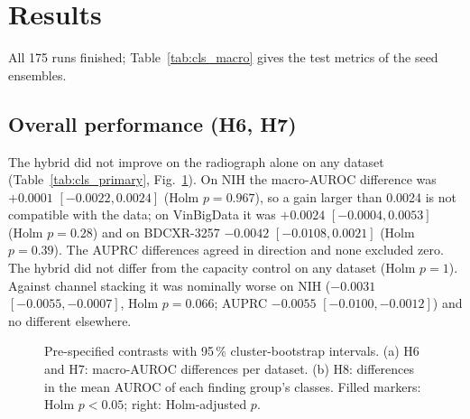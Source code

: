 \section{Results}
\label{sec:cls_results}
All 175 runs finished; Table~\ref{tab:cls_macro} gives the test metrics of the seed ensembles.

\begin{table}[htbp]
\centering\small
\caption{Test macro-AUROC and macro-AUPRC of the seed ensembles (five seeds; BDCXR-3257: out-of-fold over five folds). Descriptive; the
tests are in Tables~\ref{tab:cls_primary} and~\ref{tab:cls_groups}. orig: radiograph; soft: soft-tissue image; early: three images as
channels; hybrid: three streams; ctrl: radiograph in three streams.}
\label{tab:cls_macro}
\end{table}

\subsection{Overall performance (H6, H7)}
The hybrid did not improve on the radiograph alone on any dataset (Table~\ref{tab:cls_primary}, Fig.~\ref{fig:cls_forest}). On NIH the
macro-AUROC difference was $+0.0001$ $[-0.0022,0.0024]$ (Holm $p=0.967$), so a gain larger than 0.0024 is not compatible with the data; on
VinBigData it was $+0.0024$ $[-0.0004,0.0053]$ (Holm $p=0.28$) and on BDCXR-3257 $-0.0042$ $[-0.0108,0.0021]$ (Holm $p=0.39$). The
AUPRC differences agreed in direction and none excluded zero. The hybrid did not differ from the capacity control on any dataset (Holm
$p=1$). Against channel stacking it was nominally worse on NIH ($-0.0031$ $[-0.0055,-0.0007]$, Holm $p=0.066$; AUPRC $-0.0055$
$[-0.0100,-0.0012]$) and no different elsewhere.

\begin{table}[htbp]
\centering\footnotesize
\caption{H6 (primary) and H7: differences of the seed ensembles with 95\,\% cluster-bootstrap intervals (\num{10000} resamples). Holm: H6
over the three datasets, H7 over its six tests.}
\label{tab:cls_primary}
\end{table}

\begin{figure}[htbp]
\centering
{}
\caption{Pre-specified contrasts with 95\,\% cluster-bootstrap intervals. (a) H6 and H7: macro-AUROC differences per dataset. (b) H8:
differences in the mean AUROC of each finding group's classes. Filled markers: Holm $p<0.05$; right: Holm-adjusted $p$.}
\label{fig:cls_forest}
\end{figure}

